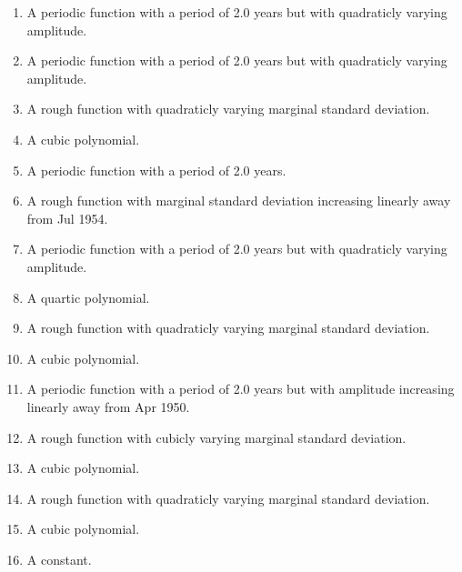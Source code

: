 \documentclass[11pt,a4paper]{article}
\begin{document}
\begin{enumerate}
  \item A periodic function with a period of 2.0 years but with quadraticly varying amplitude.
  \item A periodic function with a period of 2.0 years but with quadraticly varying amplitude.
  \item A rough function with quadraticly varying marginal standard deviation.
  \item A cubic polynomial.
  \item A periodic function with a period of 2.0 years.
  \item A rough function with marginal standard deviation increasing linearly away from Jul 1954.
  \item A periodic function with a period of 2.0 years but with quadraticly varying amplitude.
  \item A quartic polynomial.
  \item A rough function with quadraticly varying marginal standard deviation.
  \item A cubic polynomial.
  \item A periodic function with a period of 2.0 years but with amplitude increasing linearly away from Apr 1950.
  \item A rough function with cubicly varying marginal standard deviation.
  \item A cubic polynomial.
  \item A rough function with quadraticly varying marginal standard deviation.
  \item A cubic polynomial.
  \item A constant.
\end{enumerate}
\end{document}
